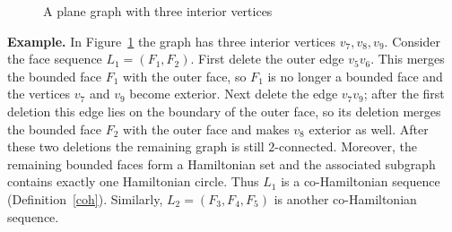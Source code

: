 \documentclass[12pt]{amsart}
\theoremstyle{theorem}%
\theoremstyle{definition}%
\begin{document}
\begin{figure}[H]
\centering
{}
\caption{A plane graph with three interior vertices}
\label{3b}
\end{figure}


\textbf{Example.}
In Figure~\ref{3b} the graph has three interior vertices $v_7,v_8,v_9$.
Consider the face sequence $L_1=(F_1,F_2)$.
First delete the outer edge $v_5v_6$.
This merges the bounded face $F_1$ with the outer face, so $F_1$ is no longer a bounded face and the vertices
$v_7$ and $v_9$ become exterior.
Next delete the edge $v_7v_9$; after the first deletion this edge lies on the boundary of the outer face, so its
deletion merges the bounded face $F_2$ with the outer face and makes $v_8$ exterior as well.
After these two deletions the remaining graph is still $2$-connected.
Moreover, the remaining bounded faces form a Hamiltonian set and the associated subgraph contains exactly one
Hamiltonian circle.
Thus $L_1$ is a co-Hamiltonian sequence (Definition~\ref{coh}).
Similarly, $L_2=(F_3,F_4,F_5)$ is another co-Hamiltonian sequence.
\end{document}
